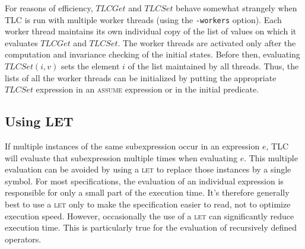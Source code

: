 \documentclass[fleqn,leqno]{article}
\begin{document}
For reasons of efficiency, $TLCGet$ and $TLCSet$ behave somewhat
strangely when TLC is run with multiple worker threads (using the
\texttt{-workers} option).  Each worker thread maintains its own
individual copy of the list of values on which it evaluates $TLCGet$
and $TLCSet$.  The worker threads are activated only after the
computation and invariance checking of the initial states.  Before
then, evaluating $TLCSet(i,v)$ sets the element $i$ of the list
maintained by all threads.  Thus, the lists of all the worker threads
can be initialized by putting the appropriate $TLCSet$ expression in
an \textsc{assume} expression or in the initial predicate.


\subsection[Using LET]{Using LET%
} 

If multiple instances of the same subexpression occur in an expression
$e$, TLC will evaluate that subexpression multiple times when
evaluating $e$.  This multiple evaluation can be avoided by using a
\textsc{let} to replace those instances by a single symbol.  For most
specifications, the evaluation of an individual expression is
responsible for only a small part of the execution time.  It's
therefore generally best to use a \textsc{let} only to make the
specification easier to read, not to optimize execution speed.
However, occasionally the use of a \textsc{let} can significantly
reduce execution time.  This is particularly true for the evaluation
of recursively defined operators.
\end{document}
